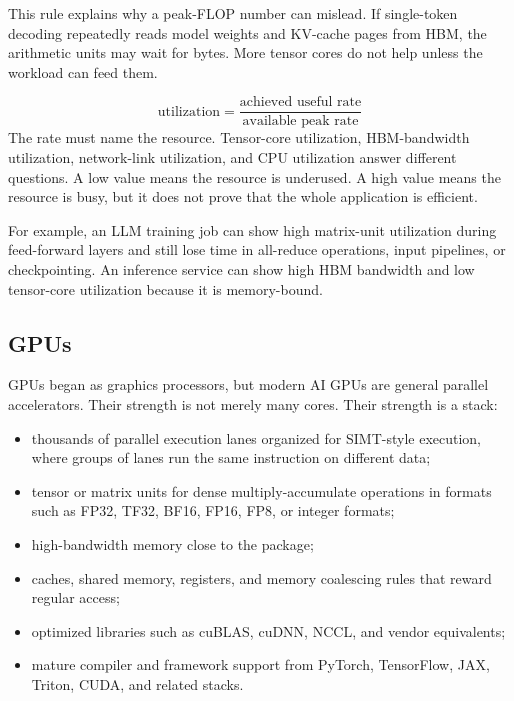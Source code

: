 This rule explains why a peak-FLOP number can mislead. If single-token decoding repeatedly reads model weights and KV-cache pages from HBM, the arithmetic units may wait for bytes. More tensor cores do not help unless the workload can feed them.

\begin{keyequation}
\[
  \text{utilization} =
  \frac{\text{achieved useful rate}}{\text{available peak rate}}
\]
\tcblower
The rate must name the resource. Tensor-core utilization, HBM-bandwidth utilization, network-link utilization, and CPU utilization answer different questions. A low value means the resource is underused. A high value means the resource is busy, but it does not prove that the whole application is efficient.
\end{keyequation}

For example, an LLM training job can show high matrix-unit utilization during feed-forward layers and still lose time in all-reduce operations, input pipelines, or checkpointing. An inference service can show high HBM bandwidth and low tensor-core utilization because it is memory-bound.

\subsection{GPUs}

GPUs began as graphics processors, but modern AI GPUs are general parallel accelerators. Their strength is not merely many cores. Their strength is a stack:

\begin{itemize}[leftmargin=*]
  \item thousands of parallel execution lanes organized for SIMT-style execution, where groups of lanes run the same instruction on different data;
  \item tensor or matrix units for dense multiply-accumulate operations in formats such as FP32, TF32, BF16, FP16, FP8, or integer formats;
  \item high-bandwidth memory close to the package;
  \item caches, shared memory, registers, and memory coalescing rules that reward regular access;
  \item optimized libraries such as cuBLAS, cuDNN, NCCL, and vendor equivalents;
  \item mature compiler and framework support from PyTorch, TensorFlow, JAX, Triton, CUDA, and related stacks.
\end{itemize}

